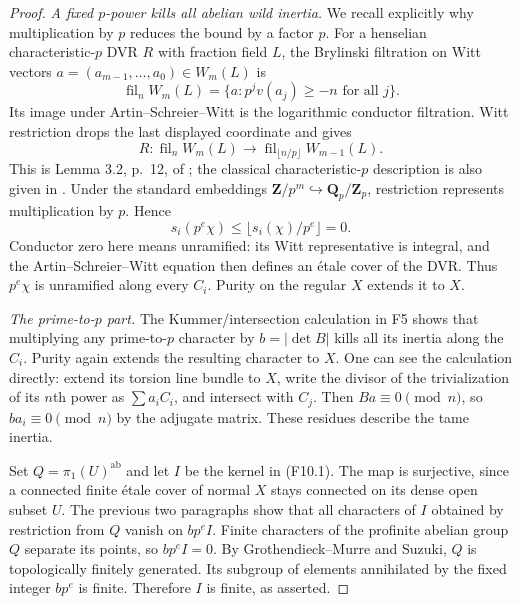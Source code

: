 \begin{proof}
\emph{A fixed $p$-power kills all abelian wild inertia.}
We recall explicitly why multiplication by $p$ reduces the bound
by a factor $p$. For a henselian characteristic-$p$ DVR $R$ with
fraction field $L$, the Brylinski filtration on Witt vectors
$a=(a_{m-1},\ldots,a_0)\in W_m(L)$ is
\[
 \operatorname{fil}_nW_m(L)
   =\{a:p^jv(a_j)\geq-n\text{ for all }j\}.
\]
Its image under Artin--Schreier--Witt is the logarithmic conductor
filtration. Witt restriction drops the last displayed coordinate
and gives
\[
 R:\operatorname{fil}_nW_m(L)
       \longrightarrow\operatorname{fil}_{\lfloor n/p\rfloor}
                         W_{m-1}(L).
 \tag{F10.6}
\]
This is Lemma 3.2, p.~12, of \cite{KrishnaMajumder2026}; the
classical characteristic-$p$ description is also given in
\cite[\S3.2.2--3.2.4, pp.~14--15]{KatoLealSaito2019}.
Under the standard embeddings $\mathbf Z/p^m\hookrightarrow
\mathbf Q_p/\mathbf Z_p$, restriction represents multiplication
by $p$. Hence
\[
 s_i(p^e\chi)\leq\lfloor s_i(\chi)/p^e\rfloor=0.
\]
Conductor zero here means unramified: its Witt representative is
integral, and the Artin--Schreier--Witt equation then defines an
\'etale cover of the DVR. Thus $p^e\chi$ is unramified along every
$C_i$. Purity on the regular $X$ extends it to $X$.

\emph{The prime-to-$p$ part.}
The Kummer/intersection calculation in F5 shows that multiplying
any prime-to-$p$ character by $b=|\det B|$ kills all its inertia
along the $C_i$. Purity again extends the resulting character
to $X$. One can see the calculation directly: extend its torsion
line bundle to $X$, write the divisor of the trivialization of
its $n$th power as $\sum a_i C_i$, and intersect with $C_j$.
Then $Ba\equiv0\pmod n$, so $ba_i\equiv0\pmod n$ by the
adjugate matrix. These residues describe the tame inertia.

Set $Q=\pi_1(U)^{\mathrm{ab}}$ and let $I$ be the kernel in
(F10.1). The map is surjective, since a connected finite \'etale
cover of normal $X$ stays connected on its dense open subset $U$.
The previous two paragraphs show that all characters of $I$
obtained by restriction from $Q$ vanish on $bp^eI$. Finite
characters of the profinite abelian group $Q$ separate its
points, so $bp^eI=0$. By Grothendieck--Murre and Suzuki, $Q$ is
topologically finitely generated. Its subgroup of elements
annihilated by the fixed integer $bp^e$ is finite. Therefore $I$
is finite, as asserted.
\end{proof}


